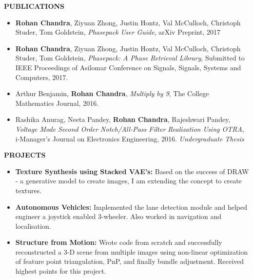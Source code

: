 \documentclass[a4paper,8pt]{article}
\newcommand{\resheading}[1]{\begin{tcolorbox} \begin{center} #1 \end{center} \end{tcolorbox}}
\begin{document}
\resheading{\textbf{PUBLICATIONS} }
\begin{itemize}[noitemsep]
\item \noindent \textbf{Rohan Chandra}, Ziyuan Zhong, Justin Hontz, Val McCulloch, Christoph Studer, Tom Goldstein, \textit{Phasepack User Guide}, arXiv Preprint, 2017
\item \noindent \textbf{Rohan Chandra}, Ziyuan Zhong, Justin Hontz, Val McCulloch, Christoph Studer, Tom Goldstein, \textit{Phasepack: A Phase Retrieval Library}, Submitted to IEEE Proceedings of Asilomar Conference on Signals, Signals, Systems and Computers, 2017.
\item \noindent Arthur Benjamin, \textbf{Rohan Chandra}, \textit{Multiply by 9}, The College Mathematics Journal, 2016.
\item \noindent Rashika Anurag, Neeta Pandey, \textbf{Rohan Chandra}, Rajeshwari Pandey, \textit{Voltage Mode Second Order Notch/All-Pass Filter Realization Using OTRA}, i-Manager's Journal on Electronics Engineering, 2016. \textit{Undergraduate Thesis}
\end{itemize}




\resheading{\textbf{PROJECTS} }
\begin{itemize}[noitemsep]
\item \textbf{Texture Synthesis using Stacked VAE's:} Based on the success of DRAW - a generative model to create images, I am extending the concept to create textures.

\item\textbf{Autonomous Vehicles:} Implemented the lane detection module and helped engineer a joystick enabled 3-wheeler. Also worked in navigation and localisation. 

\item \textbf{Structure from Motion:} Wrote code from scratch and successfully reconstructed a 3-D scene from multiple images using non-linear optimization of feature point triangulation, PnP, and finally bundle adjustment. Received highest points for this project.
\end{itemize}
\end{document}
